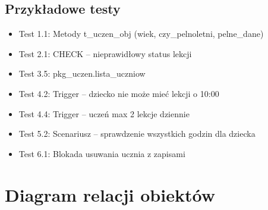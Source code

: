 \documentclass[12pt,a4paper]{article}
\begin{document}
\subsection{Przykładowe testy}
\begin{itemize}[nosep]
    \item Test 1.1: Metody t\_uczen\_obj (wiek, czy\_pelnoletni, pelne\_dane)
    \item Test 2.1: CHECK -- nieprawidłowy status lekcji
    \item Test 3.5: pkg\_uczen.lista\_uczniow
    \item Test 4.2: Trigger -- dziecko nie może mieć lekcji o 10:00
    \item Test 4.4: Trigger -- uczeń max 2 lekcje dziennie
    \item Test 5.2: Scenariusz -- sprawdzenie wszystkich godzin dla dziecka
    \item Test 6.1: Blokada usuwania ucznia z zapisami
\end{itemize}

\section{Diagram relacji obiektów}
\end{document}
